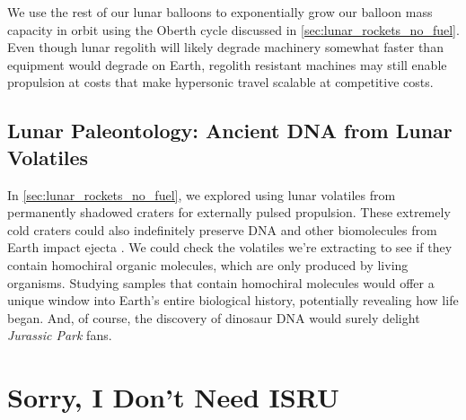 \documentclass{article}
\begin{document}
{We use the rest of our lunar balloons to exponentially grow our balloon mass capacity in orbit using the Oberth cycle discussed in \autoref{sec:lunar_rockets_no_fuel}.  Even though lunar regolith will likely degrade machinery somewhat faster than equipment would degrade on Earth, regolith resistant machines  may still enable propulsion at costs that make hypersonic travel scalable at competitive costs.

\subsection{Lunar Paleontology: Ancient DNA from Lunar Volatiles}\label{sec:jurassic_dark}
In \autoref{sec:lunar_rockets_no_fuel}, we explored using lunar volatiles from permanently shadowed craters for externally pulsed propulsion. These extremely cold craters could also indefinitely preserve DNA and other biomolecules from Earth impact ejecta \cite{dino_dna}. We could check the volatiles we're extracting to see if they contain homochiral organic molecules, which are only produced by living organisms.   Studying samples that contain homochiral molecules would offer a unique window into Earth's entire biological history, potentially revealing how life began. And, of course, the discovery of dinosaur DNA would surely delight \textit{Jurassic Park} \cite{jurassic_park} fans.

\section{Sorry, I Don't Need ISRU}
}
\end{document}
